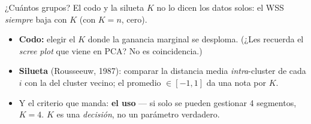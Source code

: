 \documentclass{beamer}
\newcommand{\1}{\mathbb{I}}
\begin{document}
\begin{frame}{¿Cuántos grupos? El codo y la silueta}
\small
$K$ no lo dicen los datos solos: el WSS \emph{siempre} baja con $K$ (con $K = n$, cero).

\vspace{0.15cm}
\begin{center}
\end{center}
\pause

\begin{itemize}\itemsep3pt
  \item \textbf{Codo:} elegir el $K$ donde la ganancia marginal se desploma. (¿Les recuerda el \emph{scree plot} que viene en PCA? No es coincidencia.)
  \item \textbf{Silueta} (Rousseeuw, 1987): comparar la distancia media \emph{intra}-cluster de cada $i$ con la del cluster vecino; el promedio $\in [-1,1]$ da una nota por $K$.
  \item Y el criterio que manda: \textbf{el uso} --- si solo se pueden gestionar 4 segmentos, $K = 4$. $K$ es una \emph{decisión}, no un parámetro verdadero.
\end{itemize}
\end{frame}
\end{document}

